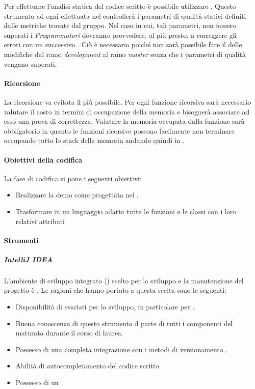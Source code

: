 Per effettuare l’analisi statica del codice scritto è possibile utilizzare . Questo strumento ad ogni  effettuata nel  controllerà i parametri di qualità statici definiti dalle metriche trovate dal gruppo. Nel caso in cui, tali parametri, non fossero superati i \textit{Programmatori} dovranno provvedere, al più presto, a correggere gli errori con un successivo . Ciò è necessario poiché non sarà possibile fare il  delle modifiche dal ramo \textit{development} al ramo \textit{master} senza che i parametri di qualità vengano superati.
  
\paragraph{Ricorsione}
La ricorsione va evitata il più possibile. Per ogni funzione ricorsiva sarà necessario valutare il costo in termini di occupazione della memoria e bisognerà associare ad esso una prova di correttezza.
Valutare la memoria occupata dalla funzione sarà obbligatorio in quanto le funzioni ricorsive possono facilmente non terminare occupando tutto lo stack della memoria andando quindi in .

\paragraph{Obiettivi della codifica}
La fase di codifica si pone i seguenti obiettivi:
\begin{itemize}
\item Realizzare la demo come progettata nel \DDP.
\item Trasformare in un linguaggio adatto tutte le funzioni e le classi con i loro relativi attributi 
\end{itemize}

\paragraph{Strumenti}

\subparagraph{IntelliJ IDEA}
L'ambiente di sviluppo integrato () scelto per lo sviluppo e la manutenzione del progetto è . Le ragioni che hanno portato a questa scelta sono le seguenti:
\begin{itemize}
\item Disponibilità di svariati  per lo sviluppo, in particolare per .
\item Buona conoscenza di questo strumento d parte di tutti i componenti del  maturata durante il corso di laurea.
\item Possesso di una completa integrazione con i metodi di versionamento .
\item Abilità di autocompletamento del codice  scritto.
\item Possesso di un  .
\end{itemize}

